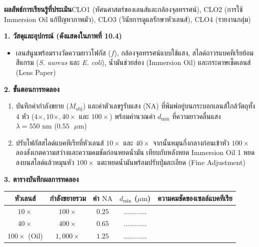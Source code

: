 \begin{labbox}
\noindent\textbf{ผลลัพธ์การเรียนรู้ที่ประเมิน}\quad CLO1 (ทัศนศาสตร์ของเลนส์และกล้องจุลทรรศน์), CLO2 (การใช้ Immersion Oil แก้ปัญหาภาพมัว), CLO3 (วินัยการดูแลรักษาหัวเลนส์), CLO4 (รายงานกลุ่ม)

\vspace{4pt}
\noindent\textbf{1. วัสดุและอุปกรณ์ (ดังแสดงใน\mbox{ภาพที่} 10.4)}
\begin{itemize}
    \item เลนส์นูนพร้อมรางวัดความยาวโฟกัส ($f$), กล้องจุลทรรศน์แบบใช้แสง, สไลด์ถาวรแบคทีเรียย้อมสีแกรม (\textit{S. aureus} และ \textit{E. coli}), น้ำมันช่วยส่อง (Immersion Oil) และกระดาษเช็ดเลนส์ (Lens Paper)
\end{itemize}

\noindent\textbf{2. ขั้นตอนการทดลอง}
\begin{enumerate}
    \item บันทึกค่ากำลังขยาย ($M_{\text{obj}}$) และค่าตัวเลขรูรับแสง ($\text{NA}$) ที่พิมพ์อยู่บนกระบอกเลนส์ใกล้วัตถุทั้ง 4 หัว ($4\times, 10\times, 40\times$ และ $100\times$) พร้อมคำนวณค่า $d_{\min}$ ที่ความยาวคลื่นแสง $\lambda = 550\text{ nm}$ ($0.55\text{ }\mu\text{m}$)
    \item ปรับโฟกัสสไลด์แบคทีเรียที่หัวเลนส์ $10\times$ และ $40\times$ จากนั้นหมุนกึ่งกลางก่อนเข้าหัว $100\times$ ลองสังเกตความสว่างและความคมชัดก่อนหยดน้ำมัน เทียบกับหลังหยด Immersion Oil 1 หยดลงบนสไลด์แล้วหมุนหัว $100\times$ แตะหยดน้ำมันพร้อมปรับปุ่มละเอียด (Fine Adjustment)
\end{enumerate}

\noindent\textbf{3. ตารางบันทึกผลการทดลอง}
\begin{center}
\footnotesize\setlength{\tabcolsep}{3.5pt}
\begin{tabularx}{\linewidth}{c c c c >{\raggedright\arraybackslash}X}
\toprule
\textbf{หัวเลนส์} & \textbf{กำลังขยายรวม} & \textbf{ค่า $\text{NA}$} & \textbf{$d_{\min}$ ($\mu\text{m}$)} & \textbf{ความคมชัดของเซลล์แบคทีเรีย} \\
\midrule
$10\times$ & $100\times$ & $0.25$ & ............ & \dotfill \\
$40\times$ & $400\times$ & $0.65$ & ............ & \dotfill \\
$100\times$ (Oil) & $1{,}000\times$ & $1.25$ & ............ & \dotfill \\
\bottomrule
\end{tabularx}
\end{center}
\end{labbox}

